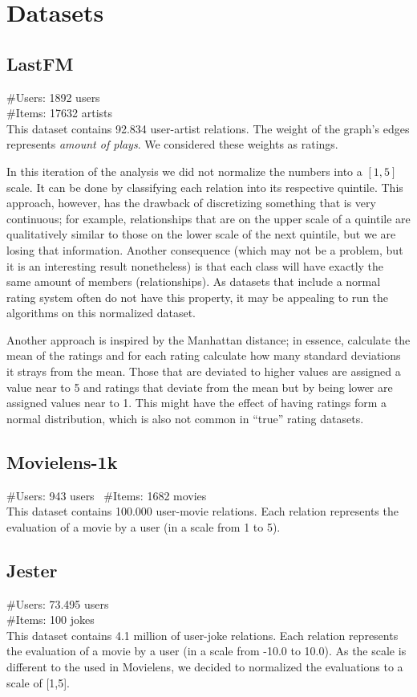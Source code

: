 \documentclass[a4paper]{article}
\begin{document}
\section{Datasets}
\subsection{LastFM}
\#Users: 1892 users \\
\#Items: 17632 artists \\
This dataset contains 92.834 user-artist relations. The weight of the graph's edges represents \textit{amount of plays}. We considered these weights as ratings.

In this iteration of the analysis we did not normalize the numbers into a $[1,5]$ scale. It can be done by classifying each relation into its respective quintile. This approach, however, has the drawback of discretizing something that is very continuous; for example, relationships that are on the upper scale of a quintile are qualitatively similar to those on the lower scale of the next quintile, but we are losing that information. Another consequence (which may not be a problem, but it is an interesting result nonetheless) is that each class will have exactly the same amount of members (relationships). As datasets that include a normal rating system often do not have this property, it may be appealing to run the algorithms on this normalized dataset.   

Another approach is inspired by the Manhattan distance; in essence, calculate the mean of the ratings and for each rating calculate how many standard deviations it strays from the mean. Those that are deviated to higher values are assigned a value near to 5 and ratings that deviate from the mean but by being lower are assigned values near to 1. This might have the effect of having ratings form a normal distribution, which is also not common in ``true'' rating datasets.

\subsection{Movielens-1k}
\#Users: 943 users \
\#Items: 1682  movies \\
This dataset contains 100.000 user-movie relations. Each relation represents the evaluation of a movie by a user (in a scale from 1 to 5).

\subsection{Jester}
\#Users: 73.495 users \\
\#Items: 100 jokes \\
This dataset contains 4.1 million of user-joke relations. Each relation represents the evaluation of a movie by a user (in a scale from -10.0 to 10.0). As the scale is different to the used in Movielens, we decided to normalized the evaluations to a scale of [1,5]. 
\end{document}
